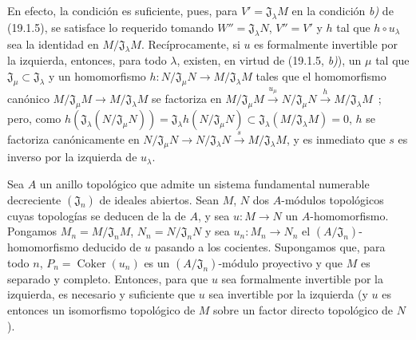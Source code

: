 En efecto, la condición es suficiente, pues, para
$V'=\mathfrak J_\lambda M$ en la condición \emph{b)} de (19.1.5), se satisface lo
requerido tomando $W''=\mathfrak J_\lambda N$, $V''=V'$ y $h$ tal que
$h\circ u_\lambda$ sea la identidad en $M/\mathfrak J_\lambda M$.
Recíprocamente, si $u$ es formalmente invertible por la izquierda, entonces, para todo
$\lambda$, existen, en virtud de (19.1.5, \emph{b)}), un $\mu$ tal que
$\mathfrak J_\mu\subset\mathfrak J_\lambda$ y un homomorfismo
$h:N/\mathfrak J_\mu N\to M/\mathfrak J_\lambda M$ tales que el homomorfismo
canónico $M/\mathfrak J_\mu M\to M/\mathfrak J_\lambda M$ se factoriza en
$M/\mathfrak J_\mu M\xrightarrow{u_\mu}N/\mathfrak J_\mu N\xrightarrow{h}M/\mathfrak J_\lambda M$~;
pero, como
$h(\mathfrak J_\lambda(N/\mathfrak J_\mu N))=\mathfrak J_\lambda h(N/\mathfrak J_\mu N)
\subset\mathfrak J_\lambda(M/\mathfrak J_\lambda M)=0$, $h$ se factoriza
canónicamente en
$N/\mathfrak J_\mu N\longrightarrow N/\mathfrak J_\lambda N\xrightarrow{s}M/\mathfrak J_\lambda M$,
y es inmediato que $s$ es inverso por la izquierda de $u_\lambda$.

\begin{proposition}[19.1.8]
\label{0.19.1.8-fr}
Sea $A$ un anillo topológico que admite un sistema fundamental numerable
decreciente $(\mathfrak J_n)$ de ideales abiertos. Sean $M$, $N$ dos
$A$-módulos topológicos cuyas topologías se deducen de la de $A$,
y sea $u:M\to N$ un $A$-homomorfismo. Pongamos
$M_n=M/\mathfrak J_nM$, $N_n=N/\mathfrak J_nN$ y sea
$u_n:M_n\to N_n$ el $(A/\mathfrak J_n)$-homomorfismo deducido de $u$
pasando a los cocientes. Supongamos que, para todo $n$,
$P_n=\operatorname{Coker}(u_n)$ es un $(A/\mathfrak J_n)$-módulo proyectivo
y que $M$ es separado y completo. Entonces, para que $u$ sea formalmente
invertible por la izquierda, es necesario y suficiente que $u$ sea invertible por la izquierda \textup{(y
$u$ es entonces un isomorfismo topológico de $M$ sobre un factor directo
topológico de $N$)}.
\end{proposition}


